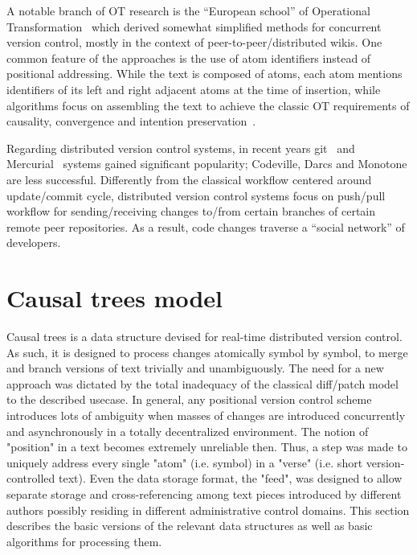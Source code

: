 \documentclass[twocolumn]{article}
\begin{document}
A notable branch of OT research is the ``European school'' of Operational Transformation~\cite{woot,inria,etc} which derived somewhat simplified methods for concurrent version control, mostly in the context of peer-to-peer/distributed wikis. One common feature of the approaches is the use of atom identifiers instead of positional addressing. While the text is composed of atoms, each atom mentions identifiers of its left and right adjacent atoms at the time of insertion, while algorithms focus on assembling the text to achieve the classic OT requirements of causality, convergence and intention preservation~\cite{ot}.

Regarding distributed version control systems, in recent years git~\cite{git} and Mercurial~\cite{mercurial} systems gained significant popularity; Codeville, Darcs and Monotone are less successful. Differently from the classical workflow centered around update/commit cycle, distributed version control systems focus on push/pull workflow for sending/receiving changes to/from certain branches of certain remote peer repositories. As a result, code changes traverse a ``social network'' of developers.


\section {Causal trees model}

   Causal trees is a data structure devised for real-time distributed
   version control. As such, it is designed to process changes
   atomically symbol by symbol, to merge and branch versions of text
   trivially and unambiguously. The need for a new approach was
   dictated by the total inadequacy of the classical diff/patch model
   to the described usecase. In general, any positional version
   control scheme introduces lots of ambiguity when masses of changes
   are introduced concurrently and asynchronously in a totally
   decentralized environment. The notion of "position" in a text
   becomes extremely unreliable then. Thus, a step was made to
   uniquely address every single "atom" (i.e. symbol) in a "verse"
   (i.e. short version-controlled text). Even the data storage format,
   the "feed", was designed to allow separate storage and
   cross-referencing among text pieces introduced by different authors
   possibly residing in different administrative control domains. This
   section describes the basic versions of the relevant data
   structures as well as basic algorithms for processing them.
   
\end{document}
